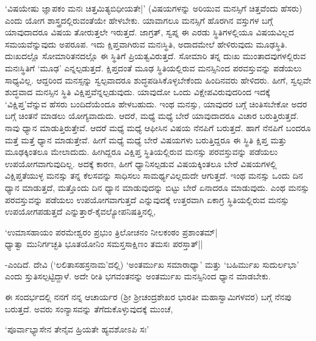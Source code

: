 `ವಿಷಯೇಷು ಜ್ಞಾಪಕಂ ಮನಃ ಚಿತ್ತಮಿತ್ಯಬಿಧೀಯತೇ|' (ವಿಷಯಗಳನ್ನು ಅರಿಯುವ ಮನಸ್ಸಿಗೆ ಚಿತ್ತವೆಂದು ಹೆಸರು) ಎಂದು ಯೋಗ ಶಾಸ್ತ್ರದಲ್ಲಿರುವಂತೆಯೇ ಹೇಳಬೇಕು. ಯಾವಾಗಲೂ ಮನಸ್ಸಿಗೆ ಹೊರಗಿನ ವಸ್ತುಗಳ ಬಗ್ಗೆ ಯಾವುದಾದರೂ ವಿಷಯ ತೋರುತ್ತಲೇ ಇರುತ್ತದೆ. ಜಾಗ್ರತ್, ಸ್ವಪ್ನ ಈ ಎರಡು ಸ್ಥಿತಿಗಳಲ್ಲಿಯೂ ವಿಷಯವಿಲ್ಲದ ಸಮಯವೆನ್ನುವುದು ಅಪರೂಪ. ಇದು ಕ್ಷಿಪ್ತವಾಗಿರುವ ಮನಃಸ್ಥಿತಿ, ಅದಾದಮೇಲೆ ಹೇಳಿರುವುದು ಮೂಢಸ್ಥಿತಿ. ದುಃಖದಲ್ಲೊ ಸೋಮಾರಿತನದಲ್ಲೊ ಈ ಸ್ಥಿತಿಗೆ ಪ್ರಿಯತ್ವವಿರುತ್ತದೆ. ಸೋಮಾರಿ ತನ್ನ ದುಃಖ ಮುಂತಾದವುಗಳಲ್ಲಿರುವ ಮನಃಸ್ಥಿತಿಗೆ `ಮೂಢ' ಎನ್ನಲ್ಪಡುತ್ತದೆ. ಕ್ಷಿಪ್ತದಂತೆ ಮೂಢ ಸ್ಥಿತಿಯಲ್ಲಿರುವ ಮನಸ್ಸಿನಿಂದ ಪರವಸ್ತುವನ್ನು ಪಡೆಯಲು ಸಾಧ್ಯವಿಲ್ಲ. ಆದ್ದರಿಂದ ಮನಸ್ಸನ್ನು ಸ್ವಲ್ಪವಾದರೂ ಶುದ್ಧಪಡಿಸಿಕೊಳ್ಳಬೇಕೆಂದು ಹಿಂದಿನವರು ಹೇಳಿದರು. ಹೀಗೆ, ಸ್ವಲ್ಪವೇ ಶುದ್ಧವಾದ ಮನಸ್ಸಿನ ಸ್ಥಿತಿ ವಿಕ್ಷಿಪ್ತವೆನ್ನಲ್ಪಡುವುದು. ಯಾವುದೋ ಒಂದು ವಿಕ್ಷೇಪವಿರುವುದರಿಂದ ಇದಕ್ಕೆ `ವಿಕ್ಷಿಪ್ತ'ವೆನ್ನುವ ಹೆಸರು ಬಂದಿದೆಯೆಂದೂ ಹೇಳಬಹುದು. ಇಂಥ ಮನಸ್ಸು, ಯಾವುದರ ಬಗ್ಗೆ ಚಿಂತಿಸಬೇಕೋ ಅದರ ಬಗ್ಗೆ ಚಿಂತನೆ ಮಾಡಲು ಯೋಗ್ಯವಾದುದು. ಆದರೆ, ಮಧ್ಯೆ ಮಧ್ಯೆ ಬೇರೆ ಯಾವುದಾದರೂ ವಿಚಾರ ಬರುತ್ತಿರುತ್ತದೆ. ನಾವು ಧ್ಯಾನ ಮಾಡುತ್ತಿರುತ್ತೇವೆ. ಆದರೆ ಮಧ್ಯೆ ಮಧ್ಯೆ ಆಫೀಸಿನ ವಿಷಯ ನೆನಪಿಗೆ ಬರುತ್ತದೆ. ಹಾಗೆ ನೆನಪಿಗೆ ಬಂದರೂ ಮತ್ತೆ ಮತ್ತೆ ಧ್ಯಾನ ಮಾಡುತ್ತೇವೆ. ಹೀಗೆ ಮಧ್ಯೆ ಮಧ್ಯೆ ಬೇರೆ ವಿಷಯಗಳು ಬರುತ್ತಿದ್ದರೂ ಈ ಸ್ಥಿತಿ ಕ್ಷಿಪ್ತ ಮತ್ತು ಮೂಢಕ್ಕಿಂತಲೂ ಮೇಲಾದುದು. ಹೀಗಿದ್ದರೂ ವಿಕ್ಷಿಪ್ತ ಸ್ಥಿತಿಯಲ್ಲಿರುವ ಮನಸ್ಸು ಪರವಸ್ತುವನ್ನು ಪಡೆಯಲು ಉಪಯೋಗವಾಗುವುದಿಲ್ಲ. ಅದಕ್ಕೆ ಕಾರಣ, ಹೀಗೆ ಧ್ಯಾನಿಸಲ್ಪಡುವ ವಿಷಯಕ್ಕಿಂತಲೂ ಬೇರೆ ವಿಷಯಗಳಲ್ಲಿ ವಿಕ್ಷಿಪ್ತತೆಯುಳ್ಳ ಮನಸ್ಸು ತನ್ನ ಕೆಲಸವನ್ನು ಸಾಧಿಸಲು ಸಾಮರ್ಥ್ಯವಿಲ್ಲದುದೇ ಆಗುತ್ತದೆ. ಇಂಥ ಮನಸ್ಸು ಒಂದು ದಿನ ಧ್ಯಾನ ಮಾಡುತ್ತದೆ, ಮತ್ತೊಂದು ದಿನ ಧ್ಯಾನ ಮಾಡುವುದನ್ನು ಬಿಟ್ಟು ಬೇರೆ ಏನಾದರೂ ಮಾಡುವುದು. ಎಂಥ ಮನಸ್ಸು ಪರವಸ್ತುವನ್ನು ಪಡೆಯಲು ಉಪಯೋಗವಾಗುತ್ತದೆ ಎನ್ನುವುದಕ್ಕೆ ಉತ್ತರವಾಗಿ ಏಕಾಗ್ರ ಸ್ಥಿತಿಯಲ್ಲಿರುವ ಮನಸ್ಸು ಉಪಯೋಗಪಡುತ್ತದೆ ಎನ್ನುತ್ತಾರೆ-ಕೈವಲ್ಯೋಪನಿಷತ್ತಿನಲ್ಲಿ,

\begin{shloka}
`ಉಮಾಸಹಾಯಂ ಪರಮೇಶ್ವರಂ ಪ್ರಭುಂ ತ್ರಿಲೋಚನಂ ನೀಲಕಂಠಂ ಪ್ರಶಾಂತಮ್|\\
ಧ್ಯಾತ್ವಾ ಮುನಿರ್ಗಚ್ಛತಿ ಭೂತಯೋನಿಂ ಸಮಸ್ತಸಾಕ್ಷಿಣಂ ತಮಸಃ ಪರಸ್ತಾತ್||
\end{shloka}

-ಎಂದಿದೆ. ದೇವಿ (`ಲಲಿತಾಸಹಸ್ರನಾಮ'ದಲ್ಲಿ) `ಅಂತರ್ಮುಖ ಸಮಾರಾಧ್ಯಾ' ಮತ್ತು `ಬಹಿರ್ಮುಖ ಸುದುರ್ಲಭಾ' ಎಂದು ಸ್ತುತಿಸಲ್ಪಟ್ಟಿದ್ದಾಳೆ. ಅದೇ ರೀತಿ ಭಗವಂತನನ್ನು ಅಂತರ್ಮುಖ ಮನಸ್ಸಿನಿಂದ ಧ್ಯಾನ ಮಾಡಬೇಕು.

ಈ ಸಂದರ್ಭದಲ್ಲಿ ನನಗೆ ನನ್ನ ಆಚಾರ್ಯರ (ಶ್ರೀ ಶ್ರೀಚಂದ್ರಶೇಖರ ಭಾರತೀ ಮಹಾಸ್ವಾಮಿಗಳವರ) ಬಗ್ಗೆ ನೆನಪು ಬರುತ್ತದೆ. ಅವರು ಸಂನ್ಯಾಸವನ್ನು ತೆಗೆದುಕೊಳ್ಳುವುದಕ್ಕೆ ಮುಂಚೆ,

\begin{shloka}
`ಪೂರ್ವಾಭ್ಯಾಸೇನ ತೇನೈವ ಹ್ರಿಯತೇ ಹ್ಯವಶೋಽಪಿ ಸಃ'
\end{shloka}

